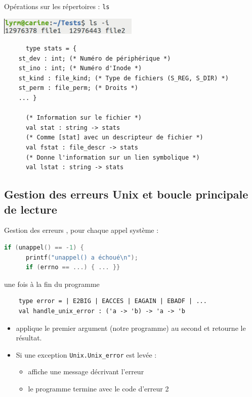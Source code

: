 \begin{frame}[fragile]{Opérations sur les répertoires : \texttt{ls}}

    \includegraphics[width=0.5\textwidth]{slides/images/shell_ls_inode.png}
    \begin{lstlisting}
      type stats = {
	st_dev : int; (* Numéro de périphérique *)
	st_ino : int; (* Numéro d'Inode *)
	st_kind : file_kind; (* Type de fichiers (S_REG, S_DIR) *)
	st_perm : file_perm; (* Droits *)
	... }

      (* Information sur le fichier *)
      val stat : string -> stats
      (* Comme [stat] avec un descripteur de fichier *)
      val fstat : file_descr -> stats
      (* Donne l'information sur un lien symbolique *)
      val lstat : string -> stats
    \end{lstlisting}

\end{frame}

\subsection{Gestion des erreurs Unix et boucle principale de lecture}

\begin{frame}[fragile]{Gestion des erreurs}
  , pour chaque appel système :
  \begin{lstlisting}[language=C]
    if (unappel() == -1) {
      printf("unappel() a échoué\n");
      if (errno == ...) { ... }}
  \end{lstlisting}
  \pause
   une fois à la fin du programme
  \begin{lstlisting}
    type error = | E2BIG | EACCES | EAGAIN | EBADF | ...
    val handle_unix_error : ('a -> 'b) -> 'a -> 'b
  \end{lstlisting}
  \pause
  \footnotesize
  \begin{itemize}[label=\small{}]
       \item applique le premier argument (notre programme) au second
         et retourne le résultat.
       \item Si une exception \texttt{Unix.Unix\_error} est levée :
         \begin{itemize}[label=]
         \item affiche une message décrivant l'erreur
         \item le programme termine avec le code d'erreur 2
         \end{itemize}
    \end{itemize}
\end{frame}

